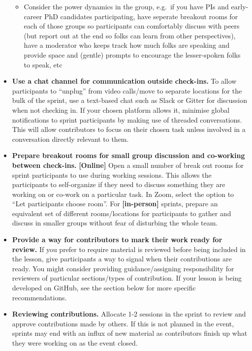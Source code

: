\documentclass[
]{book}
\providecommand{\tightlist}{%
  \setlength{\itemsep}{0pt}\setlength{\parskip}{0pt}}
\begin{document}
\begin{itemize}
  \begin{itemize}
  \tightlist
  \item
    Consider the power dynamics in the group, e.g.~if you have PIs and early-career PhD candidates participating, have seperate breakout rooms for each of those groups so participants can comfortably discuss with peers (but report out at the end so folks can learn from other perspectives), have a moderator who keeps track how much folks are speaking and provide space and (gentle) prompts to encourage the lesser-spoken folks to speak, etc
  \end{itemize}
\item
  \textbf{Use a chat channel for communication outside check-ins.}
  To allow participants to ``unplug'' from video calls/move to separate locations for the bulk of the sprint,
  use a text-based chat such as Slack or Gitter for discussion when not
  checking in.
  If your chosen platform allows it, minimise global notifications
  to sprint participants by making use of threaded conversations.
  This will allow contributors to focus on their chosen task unless involved in
  a conversation directly relevant to them.
\item
  \textbf{Prepare breakout rooms for small group discussion and co-working between check-ins.}
  \textbf{{[}Online{]}} Open a small number of break out rooms for sprint participants to use during working sessions.
  This allows the participants to self-organize if they need to discuss something they are working on or co-work on a particular task.
  In Zoom, select the option to ``Let participants choose room''.
  For \textbf{{[}in-person{]}} sprints, prepare an equivalent set of different rooms/locations
  for participants to gather and discuss in smaller groups without fear of
  disturbing the whole team.
\item
  \textbf{Provide a way for contributors to mark their work ready for review.}
  If you prefer to require material is reviewed before being included in the lesson,
  give participants a way to signal when their contributions are ready.
  You might consider providing guidance/assigning responsibility for reviewers
  of particular sections/types of contribution.
  If your lesson is being developed on GitHub, see the section below for more
  specific recommendations.
\item
  \textbf{Reviewing contributions.}
  Allocate 1-2 sessions in the sprint to review and approve contributions made by others.
  If this is not planned in the event, sprints may end with an influx of new material as contributors finish up what they were working on as the event closed.

\end{itemize}
\end{document}
